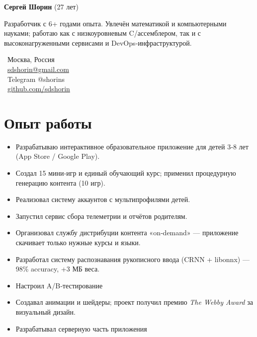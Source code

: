 \documentclass{dodiresume}
\begin{document}
\begin{minipage}{0.7\textwidth}
\begin{flushleft}
\LARGE \textbf{\textcolor{namecolor}{Сергей Шорин}} \normalsize{(27 лет)}

\vspace{0.3cm}
Разработчик с 6+ годами опыта. Увлечён математикой и компьютерными науками; работаю как с низкоуровневым C/ассемблером, так и с высоконагруженными сервисами и DevOps‑инфраструктурой.
\end{flushleft}
\end{minipage}
\begin{minipage}{0.28\textwidth}
\begin{flushright}
\faMapMarker\ Москва, Россия \\
\faEnvelope\ \href{mailto:sdshorin@gmail.com}{sdshorin@gmail.com} \\
\faPaperPlane\ Telegram @shorins \\
\faGithub\ \href{https://github.com/sdshorin}{github.com/sdshorin}
\end{flushright}
\end{minipage}

\vspace{0.1cm}

\section{Опыт работы}



\begin{itemize}
\item Разрабатываю интерактивное образовательное приложение для детей 3‑8 лет (App Store / Google Play).
\item Создал 15 мини‑игр и единый обучающий курс; применил процедурную генерацию контента (10 игр).
\item Реализовал систему аккаунтов с мультипрофилями детей.
\item Запустил сервис сбора телеметрии и отчётов родителям.
\item Организовал службу дистрибуции контента «on‑demand» — приложение скачивает только нужные курсы и языки.
\item Разработал систему распознавания рукописного ввода (CRNN + libonnx) — 98\% accuracy, +3 МБ веса.
\item Настроил A/B‑тестирование
\item Создавал анимации и шейдеры; проект получил премию \textit{The Webby Award} за визуальный дизайн.
\item Разрабатывал серверную часть приложения
\end{itemize}
\end{document}
